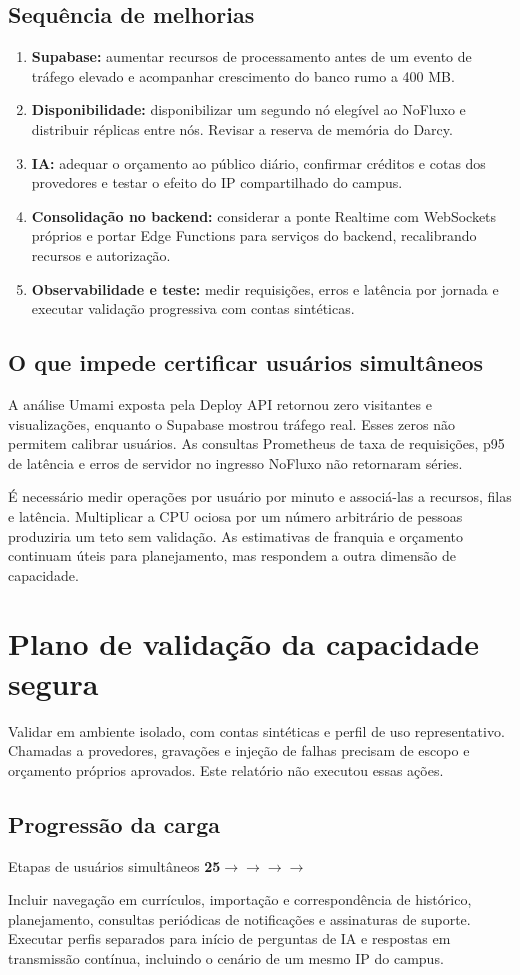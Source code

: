\documentclass[10pt,a4paper]{article}
\newcommand{\pagechapter}[1]{\clearpage\section{#1}}
\begin{document}
\subsection{Sequência de melhorias}
\begin{enumerate}
\item \textbf{Supabase:} aumentar recursos de processamento antes de um evento de tráfego elevado e acompanhar crescimento do banco rumo a 400 MB.
\item \textbf{Disponibilidade:} disponibilizar um segundo nó elegível ao NoFluxo e distribuir réplicas entre nós. Revisar a reserva de memória do Darcy.
\item \textbf{IA:} adequar o orçamento ao público diário, confirmar créditos e cotas dos provedores e testar o efeito do IP compartilhado do campus.
\item \textbf{Consolidação no backend:} considerar a ponte Realtime com WebSockets próprios e portar Edge Functions para serviços do backend, recalibrando recursos e autorização.
\item \textbf{Observabilidade e teste:} medir requisições, erros e latência por jornada e executar validação progressiva com contas sintéticas.
\end{enumerate}

\subsection{O que impede certificar usuários simultâneos}
A análise Umami exposta pela Deploy API retornou zero visitantes e visualizações, enquanto o Supabase mostrou tráfego real. Esses zeros não permitem calibrar usuários. As consultas Prometheus de taxa de requisições, p95 de latência e erros de servidor no ingresso NoFluxo não retornaram séries.

É necessário medir operações por usuário por minuto e associá-las a recursos, filas e latência. Multiplicar a CPU ociosa por um número arbitrário de pessoas produziria um teto sem validação. As estimativas de franquia e orçamento continuam úteis para planejamento, mas respondem a outra dimensão de capacidade.

\pagechapter{Plano de validação da capacidade segura}
Validar em ambiente isolado, com contas sintéticas e perfil de uso representativo. Chamadas a provedores, gravações e injeção de falhas precisam de escopo e orçamento próprios aprovados. Este relatório não executou essas ações.

\subsection{Progressão da carga}
\begin{NFBox}{Etapas de usuários simultâneos}
\centering\Large\bfseries\textcolor{NFPrimary}{25\quad\(\rightarrow\)\quad\(\rightarrow\)\quad\(\rightarrow\)\quad\(\rightarrow\)}
\end{NFBox}
Incluir navegação em currículos, importação e correspondência de histórico, planejamento, consultas periódicas de notificações e assinaturas de suporte. Executar perfis separados para início de perguntas de IA e respostas em transmissão contínua, incluindo o cenário de um mesmo IP do campus.
\end{document}
